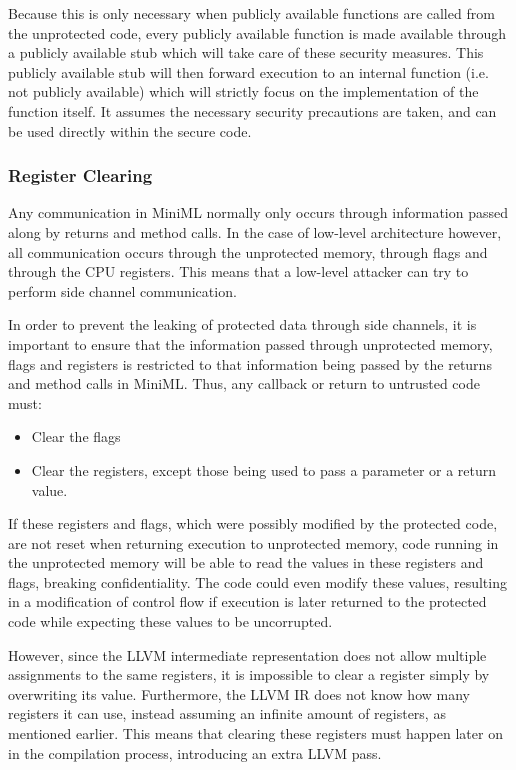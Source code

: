 Because this is only necessary when publicly available functions are called from the unprotected code, every publicly available function is made available through a publicly available stub which will take care of these security measures.
This publicly available stub will then forward execution to an internal function (i.e. not publicly available) which will strictly focus on the implementation of the function itself.
It assumes the necessary security precautions are taken, and can be used directly within the secure code.

\subsubsection{Register Clearing}
Any communication in \mbox{MiniML} normally only occurs through information passed along by returns and method calls.
In the case of low-level architecture however, all communication occurs through the unprotected memory, through flags and through the CPU registers.
This means that a low-level attacker can try to perform side channel communication.

In order to prevent the leaking of protected data through side channels, it is important to ensure that the information passed through unprotected memory, flags and registers is restricted to that information being passed by the returns and method calls in \mbox{MiniML}.
Thus, any callback or return to untrusted code must: %
\begin{itemize}
\item Clear the flags
\item Clear the registers, except those being used to pass a parameter or a return value.
\end{itemize}

If these registers and flags, which were possibly modified by the protected code, are not reset when returning execution to unprotected memory, code running in the unprotected memory will be able to read the values in these registers and flags, breaking confidentiality. The code could even modify these values, resulting in a modification of control flow if execution is later returned to the protected code while expecting these values to be uncorrupted.

However, since the LLVM intermediate representation does not allow multiple assignments to the same registers, it is impossible to clear a register simply by overwriting its value.
Furthermore, the LLVM IR does not know how many registers it can use, instead assuming an infinite amount of registers, as mentioned earlier. This means that clearing these registers must happen later on in the compilation process, introducing an extra LLVM pass.


